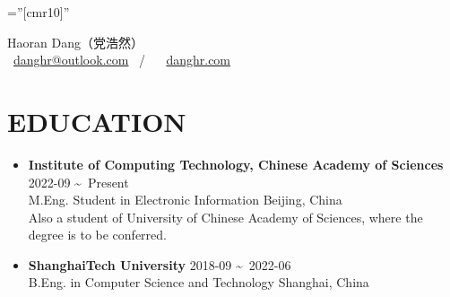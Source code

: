\documentclass[a4paper,10pt]{ctexart} %
\begin{document}
\pagestyle{empty} %

\font\fb=''[cmr10]'' %

\newenvironment{keepsection}{\par\noindent\minipage{\textwidth}}{\endminipage\par}

\newcommand{\datetlide}{\textasciitilde \ }



\begin{keepsection}
\begin{center}
    {\LARGE Haoran Dang}（党浩然） \\
     \  \href{mailto:danghr@outlook.com}{danghr@outlook.com} \  / \   \  \href{https://www.danghr.com}{danghr.com} \\
\end{center}
\end{keepsection}


\begin{keepsection}

\section{EDUCATION}

\begin{itemize}
    \item \textbf{Institute of Computing Technology, Chinese Academy of Sciences} \hfill 2022-09 \datetlide Present \\
    M.Eng. Student in Electronic Information  \hfill Beijing, China \\
    {\small Also a student of University of Chinese Academy of Sciences, where the degree is to be conferred.}
    \item \textbf{ShanghaiTech University} \hfill 2018-09 \datetlide 2022-06 \\
    B.Eng. in Computer Science and Technology  \hfill Shanghai, China
\end{itemize}

\end{keepsection}
\end{document}
